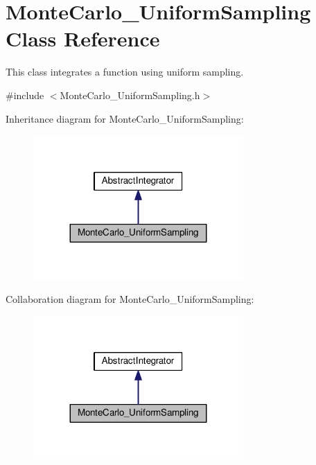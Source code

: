 \hypertarget{class_monte_carlo___uniform_sampling}{}\section{Monte\+Carlo\+\_\+\+Uniform\+Sampling Class Reference}
\label{class_monte_carlo___uniform_sampling}


This class integrates a function using uniform sampling.  




{\ttfamily \#include $<$Monte\+Carlo\+\_\+\+Uniform\+Sampling.\+h$>$}



Inheritance diagram for Monte\+Carlo\+\_\+\+Uniform\+Sampling\+:
\nopagebreak
\begin{figure}[H]
\begin{center}
\leavevmode
\includegraphics[width=227pt]{class_monte_carlo___uniform_sampling__inherit__graph}
\end{center}
\end{figure}


Collaboration diagram for Monte\+Carlo\+\_\+\+Uniform\+Sampling\+:
\nopagebreak
\begin{figure}[H]
\begin{center}
\leavevmode
\includegraphics[width=227pt]{class_monte_carlo___uniform_sampling__coll__graph}
\end{center}
\end{figure}
